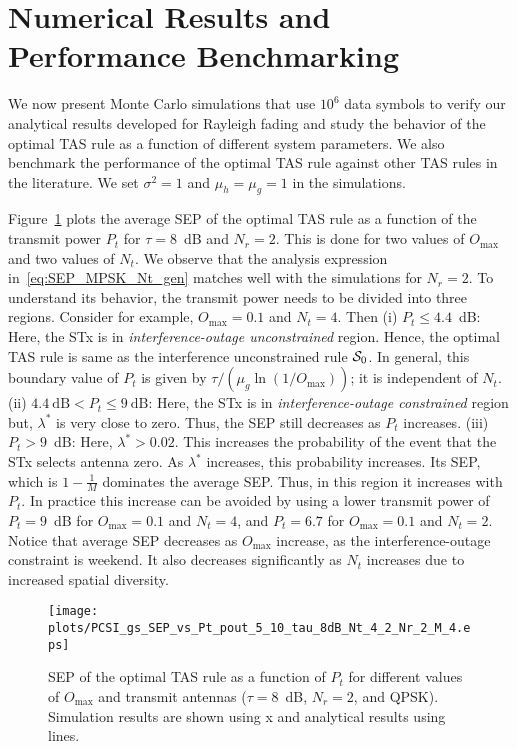 \documentclass[12pt,draftcls,peerreview,onecolumn]{IEEEtran}
\newcommand{\lam}{\lambda}
\newcommand{\lamstar}{\lam^{*}}
\newcommand{\mug}{{\mu_{g}}}
\newcommand{\muh}{{\mu_{h}}}
\newcommand{\Nt}{{N_t}}
\newcommand{\Nr}{{N_r}}
\newcommand{\Pt}{{P_t}}
\newcommand{\noisevar}{\sigma^2}
\newcommand{\outmax}{O_{\text{max}}}
\newcommand{\itau}{\tau}
\newcommand{\caluncons}{{\cal S_{\text{0}}}}
\begin{document}
\section{Numerical Results and Performance Benchmarking}
\label{sec:results}
We now present Monte Carlo simulations that use $10^6$ data symbols to verify our analytical results developed for Rayleigh fading and study the behavior of the optimal TAS rule as a function of different system parameters. We also benchmark the performance of the optimal TAS rule against other TAS rules in the literature. We set $\noisevar =1$ and $\muh =\mug = 1$ in the simulations. 

Figure~\ref{fig:SEP_vs_PT} plots the average SEP of the optimal TAS rule as a function of the transmit power $\Pt$ for $\itau=8$~dB and $\Nr=2$. This is done for two values of $\outmax$ and two values of $\Nt$. We observe that the analysis expression in~\eqref{eq:SEP_MPSK_Nt_gen} matches well with the simulations for $\Nr=2$. To understand its behavior, the transmit power needs to be divided into three regions. Consider for example, $\outmax=0.1$ and $\Nt=4$. Then (i) $\Pt \leq 4.4$~dB: Here, the STx is in {\em interference-outage unconstrained} region. Hence, the optimal TAS rule is same as the interference unconstrained rule $\caluncons$. In general, this boundary value of $\Pt$ is given by ${\tau}/{\left(\mug\ln\left(1/\outmax\right)\right)}$; it is independent of $\Nt$. (ii) $4.4~\text{dB} <\Pt \leq 9~\text{dB}$: Here, the STx is in {\em interference-outage constrained} region but, $\lamstar$ is very close to zero. Thus, the SEP still decreases as $\Pt$ increases. (iii) $\Pt > 9$~dB: Here, $\lamstar>0.02$. This increases the probability of the event that the STx selects antenna zero. As $\lamstar$ increases, this probability increases. Its SEP, which is $1- \frac{1}{M}$ dominates the average SEP. Thus, in this region it increases with $\Pt$. In practice this increase can be avoided by using a lower transmit power of $\Pt=9$~dB for $\outmax=0.1$ and $\Nt=4$, and $\Pt=6.7$ for $\outmax=0.1$ and $\Nt=2$.  Notice that average SEP decreases as $\outmax$ increase, as the interference-outage constraint is weekend. It also decreases significantly as $\Nt$ increases due to increased spatial diversity.      

\begin{figure}
  \centering \texttt{[image: plots/PCSI\_gs\_SEP\_vs\_Pt\_pout\_5\_10\_tau\_8dB\_Nt\_4\_2\_Nr\_2\_M\_4.eps]}
  \caption{SEP of the optimal TAS rule as a function of $\Pt$ for different values of $\outmax$ and transmit antennas ($\itau = 8$~dB, $\Nr=2$, and QPSK). Simulation results are shown using x and analytical results using lines.}
\label{fig:SEP_vs_PT}
\end{figure}
\end{document}
